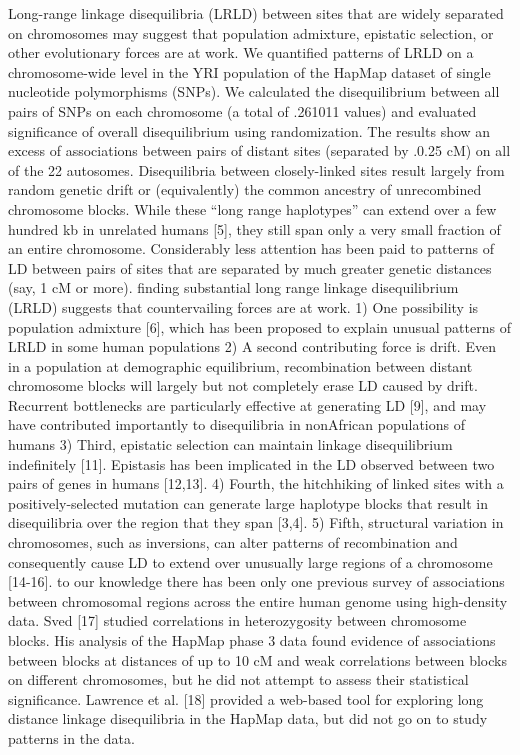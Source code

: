 Long-range linkage disequilibria (LRLD) between sites that are widely separated on chromosomes may suggest that population admixture, epistatic selection, or other evolutionary forces are at work.  \cite{koch2013long}
We quantified patterns of LRLD on a chromosome-wide level in the YRI population of the HapMap dataset of single nucleotide polymorphisms (SNPs). \cite{koch2013long}
We calculated the disequilibrium between all pairs of SNPs on each chromosome (a total of .261011 values) and evaluated significance of overall disequilibrium using randomization.  \cite{koch2013long}
The results show an excess of associations between pairs of distant sites (separated by .0.25 cM) on all of the 22 autosomes.  \cite{koch2013long}
Disequilibria between closely-linked sites result largely from random genetic drift or (equivalently) the common ancestry of unrecombined chromosome blocks.  \cite{koch2013long}
While these ``long range haplotypes'' can extend over a few hundred kb in unrelated humans [5], they still span only a very small fraction of an entire chromosome. \cite{koch2013long}
Considerably less attention has been paid to patterns of LD between pairs of sites that are separated by much greater genetic distances (say, 1 cM or more). \cite{koch2013long}
finding substantial long range linkage disequilibrium (LRLD) suggests that countervailing forces are at work. \cite{koch2013long}
1) One possibility is population admixture [6], which has been proposed to explain unusual patterns of LRLD in some human populations \cite{koch2013long}
2) A second contributing force is drift. Even in a population at demographic equilibrium, recombination between distant chromosome blocks will largely but not completely erase LD caused by drift. Recurrent bottlenecks are particularly effective at generating LD [9], and may have contributed importantly to disequilibria in nonAfrican populations of humans \cite{koch2013long}
3) Third, epistatic selection can maintain linkage disequilibrium indefinitely [11]. Epistasis has been implicated in the LD observed between two pairs of genes in humans [12,13].  \cite{koch2013long}
4) Fourth, the hitchhiking of linked sites with a positively-selected mutation can generate large haplotype blocks that result in disequilibria over the region that they span [3,4]. \cite{koch2013long}
5) Fifth, structural variation in chromosomes, such as inversions, can alter patterns of recombination and consequently cause LD to extend over unusually large regions of a chromosome [14-16]. \cite{koch2013long}
 to our knowledge there has been only one previous survey of associations between chromosomal regions across the entire human genome using high-density data. Sved [17] studied correlations in heterozygosity between chromosome blocks. His analysis of the HapMap phase 3 data found evidence of associations between blocks at distances of up to 10 cM and weak correlations between blocks on different chromosomes, but he did not attempt to assess their statistical significance. Lawrence et al. [18] provided a web-based tool for exploring long distance linkage disequilibria in the HapMap data, but did not go on to study patterns in the data. \cite{koch2013long}
